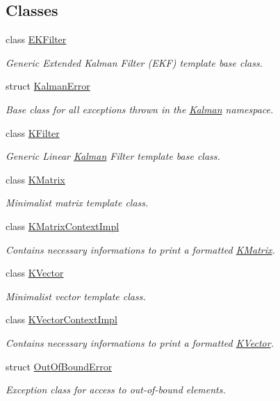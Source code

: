 \subsection*{Classes}
\begin{DoxyCompactItemize}
\item 
class \mbox{\hyperlink{classKalman_1_1EKFilter}{E\+K\+Filter}}
\begin{DoxyCompactList}\small\item\em Generic Extended Kalman Filter (E\+KF) template base class. \end{DoxyCompactList}\item 
struct \mbox{\hyperlink{structKalman_1_1KalmanError}{Kalman\+Error}}
\begin{DoxyCompactList}\small\item\em Base class for all exceptions thrown in the {\ttfamily \mbox{\hyperlink{namespaceKalman}{Kalman}}} namespace. \end{DoxyCompactList}\item 
class \mbox{\hyperlink{classKalman_1_1KFilter}{K\+Filter}}
\begin{DoxyCompactList}\small\item\em Generic Linear \mbox{\hyperlink{namespaceKalman}{Kalman}} Filter template base class. \end{DoxyCompactList}\item 
class \mbox{\hyperlink{classKalman_1_1KMatrix}{K\+Matrix}}
\begin{DoxyCompactList}\small\item\em Minimalist matrix template class. \end{DoxyCompactList}\item 
class \mbox{\hyperlink{classKalman_1_1KMatrixContextImpl}{K\+Matrix\+Context\+Impl}}
\begin{DoxyCompactList}\small\item\em Contains necessary informations to print a formatted {\ttfamily \mbox{\hyperlink{classKalman_1_1KMatrix}{K\+Matrix}}}. \end{DoxyCompactList}\item 
class \mbox{\hyperlink{classKalman_1_1KVector}{K\+Vector}}
\begin{DoxyCompactList}\small\item\em Minimalist vector template class. \end{DoxyCompactList}\item 
class \mbox{\hyperlink{classKalman_1_1KVectorContextImpl}{K\+Vector\+Context\+Impl}}
\begin{DoxyCompactList}\small\item\em Contains necessary informations to print a formatted {\ttfamily \mbox{\hyperlink{classKalman_1_1KVector}{K\+Vector}}}. \end{DoxyCompactList}\item 
struct \mbox{\hyperlink{structKalman_1_1OutOfBoundError}{Out\+Of\+Bound\+Error}}
\begin{DoxyCompactList}\small\item\em Exception class for access to out-\/of-\/bound elements. \end{DoxyCompactList}\end{DoxyCompactItemize}
